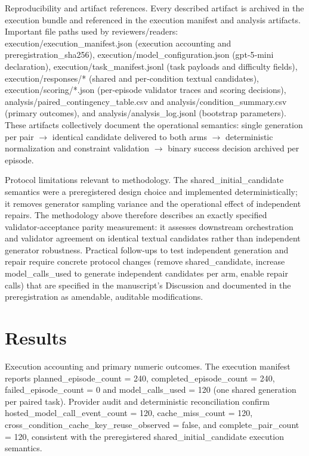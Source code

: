 \documentclass[conference]{IEEEtran}
\begin{document}
Reproducibility and artifact references. Every described artifact is archived in the execution bundle and referenced in the execution manifest and analysis artifacts. Important file paths used by reviewers/readers: execution/execution\_manifest.json (execution accounting and preregistration\_sha256), execution/model\_configuration.json (gpt‑5‑mini declaration), execution/task\_manifest.jsonl (task payloads and difficulty fields), execution/responses/* (shared and per‑condition textual candidates), execution/scoring/*.json (per‑episode validator traces and scoring decisions), analysis/paired\_contingency\_table.csv and analysis/condition\_summary.csv (primary outcomes), and analysis/analysis\_log.jsonl (bootstrap parameters). These artifacts collectively document the operational semantics: single generation per pair \ensuremath{\rightarrow} identical candidate delivered to both arms \ensuremath{\rightarrow} deterministic normalization and constraint validation \ensuremath{\rightarrow} binary success decision archived per episode.

Protocol limitations relevant to methodology. The shared\_initial\_candidate semantics were a preregistered design choice and implemented deterministically; it removes generator sampling variance and the operational effect of independent repairs. The methodology above therefore describes an exactly specified validator‑acceptance parity measurement: it assesses downstream orchestration and validator agreement on identical textual candidates rather than independent generator robustness. Practical follow‑ups to test independent generation and repair require concrete protocol changes (remove shared\_candidate, increase model\_calls\_used to generate independent candidates per arm, enable repair calls) that are specified in the manuscript's Discussion and documented in the preregistration as amendable, auditable modifications.

\section{Results}
Execution accounting and primary numeric outcomes. The execution manifest reports planned\_episode\_count = 240, completed\_episode\_count = 240, failed\_episode\_count = 0 and model\_calls\_used = 120 (one shared generation per paired task). Provider audit and deterministic reconciliation confirm hosted\_model\_call\_event\_count = 120, cache\_miss\_count = 120, cross\_condition\_cache\_key\_reuse\_observed = false, and complete\_pair\_count = 120, consistent with the preregistered shared\_initial\_candidate execution semantics.
\end{document}
